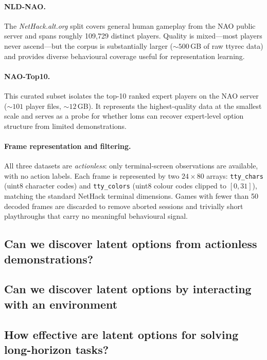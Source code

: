 \documentclass{article}
\theoremstyle{postulate}
\begin{document}
\paragraph{NLD-NAO.}
The \emph{NetHack.alt.org} split covers general human gameplay from the NAO
public server and spans roughly 109,729 distinct players.
Quality is mixed—most players never ascend—but the corpus is substantially
larger (${\sim}500$\,GB of raw ttyrec data) and provides diverse behavioural
coverage useful for representation learning.

\paragraph{NAO-Top10.}
This curated subset isolates the top-10 ranked expert players on the NAO
server (${\sim}101$ player files, ${\sim}12$\,GB).
It represents the highest-quality data at the smallest scale and serves as a
probe for whether \glspl{lom} can recover expert-level option structure from
limited demonstrations.

\paragraph{Frame representation and filtering.}
All three datasets are \emph{actionless}: only terminal-screen observations are
available, with no action labels.
Each frame is represented by two $24{\times}80$ arrays: \texttt{tty\_chars}
(uint8 character codes) and \texttt{tty\_colors} (uint8 colour codes clipped
to $[0,31]$), matching the standard NetHack terminal dimensions.
Games with fewer than 50 decoded frames are discarded to remove aborted
sessions and trivially short playthroughs that carry no meaningful behavioural
signal.

\subsection{Can we discover latent options from actionless demonstrations?}

\subsection{Can we discover latent options by interacting with an environment}

\subsection{How effective are latent options for solving long-horizon tasks?}
\end{document}
